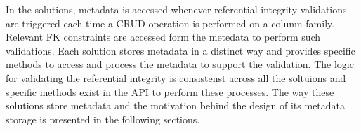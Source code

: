 In the solutions, metadata  is accessed whenever referential integrity
validations are triggered each time 
 a \ac{CRUD} operation is
performed on a column family. Relevant \ac{FK} constraints are accessed form the
metedata to perform such validations. Each solution stores metadata in a
distinct way and provides specific methods to access and process the metadata to
support the validation. The logic for validating the referential integrity is
consistenst across all the soltuions and specific methods exist in the \ac{API}
to perform these processes. The way these solutions store metadata and the
motivation
behind the design of its metadata storage is presented in the following
sections.

